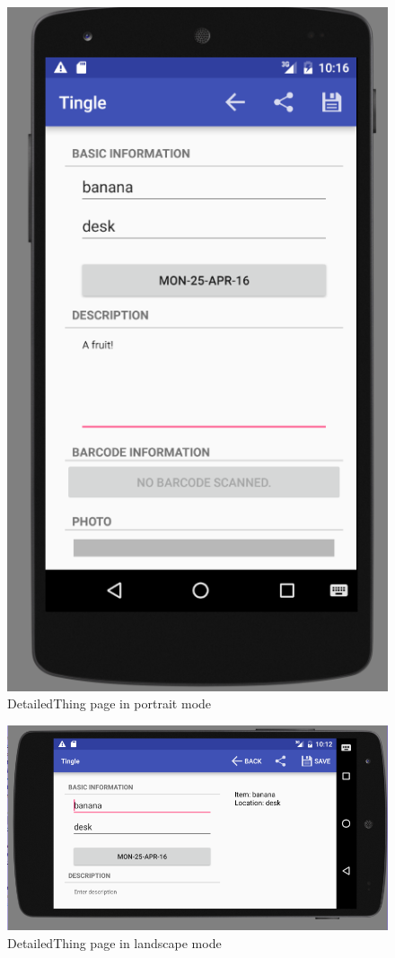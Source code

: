 \documentclass{article}
\begin{document}
\begin{figure}[h!]
	\centering
	\includegraphics[scale=0.7]{"detailedThingPage"}
	\caption{DetailedThing page in portrait mode}
	\label{fig:detailedThingPortrait}
\end{figure}
\begin{figure}[h!]
	\centering
	\includegraphics[scale=0.7]{"detailedThingLandscape"}
	\caption{DetailedThing page in landscape mode}
	\label{fig:detailedThingLandscape}
\end{figure}
\end{document}

